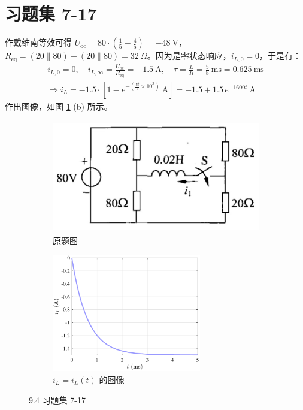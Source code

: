 \documentclass[UTF8]{report}
\theoremstyle{MyLineTheoremStyle} %
\theoremstyle{MyBlockTheoremStyle} %
\theoremstyle{MySubsubsectionStyle} %
\begin{document}
\section{习题集 7-17}
作戴维南等效可得 $U_{\text{oc}} = 80 \cdot \left(\frac{1}{5} - \frac{4}{5}\right) = -48 \ \mathrm{V}$，$R_{\text{eq}} = (20 \parallel 80) + (20 \parallel 80) = 32 \ \Omega$。因为是零状态响应，$i_{L,0} = 0$，于是有：
\begin{gather}
    i_{L,0} = 0,\quad i_{L,\infty} = \frac{U_{\text{oc}}}{R_{\text{eq}}} = -1.5 \ \mathrm{A},\quad \tau = \frac{L}{R} = \frac{5}{8} \ \mathrm{ms} =  0.625 \ \mathrm{ms} \\ 
    \Longrightarrow 
    \boxed{
        i_L = -1.5\cdot \left[1 - e^{- \left( \frac{8t}{5}\times 10^3\right)} \ \mathrm{A}\right] =  -1.5  + 1.5\,e^{- 1600 t} \ \mathrm{A}
    }
\end{gather}
作出图像，如图 \ref{9.4 习题集 7-17} (b) 所示。
\begin{figure}[H]\centering
    \begin{subfigure}[b]{0.5\columnwidth}\centering
        \includegraphics[height=140pt]{assets/9/9.4 a.png}
        \caption{原题图}
    \end{subfigure}\hfill
    \begin{subfigure}[b]{0.5\columnwidth}\centering
        \includegraphics[height=145pt]{assets/9/9.4 b.pdf}
        \caption{$i_L = i_L(t)$ 的图像}
    \end{subfigure}
    \caption{9.4 习题集 7-17}
    \label{9.4 习题集 7-17}
\end{figure}
\end{document}
